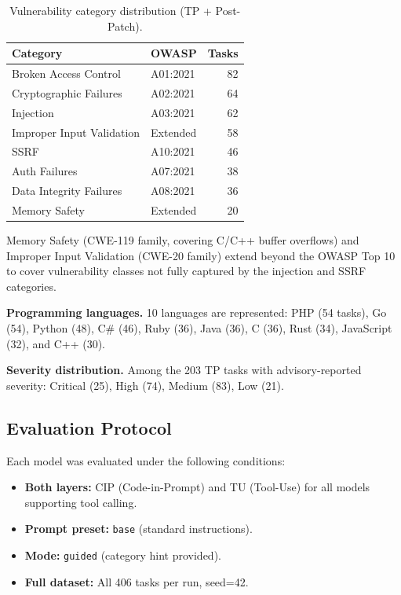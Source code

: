 \documentclass[10pt,twocolumn]{article}
\begin{document}
\begin{table}[t]
\centering
\caption{Vulnerability category distribution (TP + Post-Patch).}
\label{tab:categories_data}
\small
\begin{tabular}{@{}p{3.2cm} l r@{}}
\toprule
\textbf{Category} & \textbf{OWASP} & \textbf{Tasks} \\
\midrule
Broken Access Control      & A01:2021 & 82 \\
Cryptographic Failures     & A02:2021 & 64 \\
Injection                  & A03:2021 & 62 \\
Improper Input Validation  & Extended & 58 \\
SSRF                       & A10:2021 & 46 \\
Auth Failures              & A07:2021 & 38 \\
Data Integrity Failures    & A08:2021 & 36 \\
Memory Safety              & Extended & 20 \\
\bottomrule
\end{tabular}
\end{table}

Memory Safety (CWE-119 family, covering C/C++ buffer overflows) and Improper Input Validation (CWE-20 family) extend beyond the OWASP Top 10 to cover vulnerability classes not fully captured by the injection and SSRF categories.

\textbf{Programming languages.} 10 languages are represented: PHP (54 tasks), Go (54), Python (48), C\# (46), Ruby (36), Java (36), C (36), Rust (34), JavaScript (32), and C++ (30).

\textbf{Severity distribution.} Among the 203 TP tasks with advisory-reported severity: Critical (25), High (74), Medium (83), Low (21).

\subsection{Evaluation Protocol}
\label{sec:protocol}

Each model was evaluated under the following conditions:

\begin{itemize}[noitemsep,topsep=2pt]
    \item \textbf{Both layers:} CIP (Code-in-Prompt) and TU (Tool-Use) for all models supporting tool calling.
    \item \textbf{Prompt preset:} \texttt{base} (standard instructions).
    \item \textbf{Mode:} \texttt{guided} (category hint provided).
    \item \textbf{Full dataset:} All 406 tasks per run, seed=42.
\end{itemize}
\end{document}
